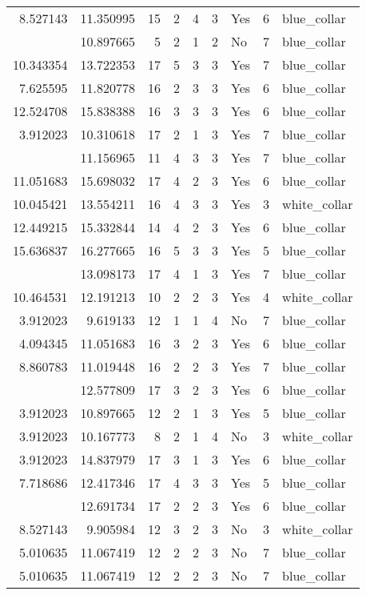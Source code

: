 \documentclass[
]{article}
\begin{document}
\begin{longtable}[t]{rrrrrllrl}
8.527143 & 11.350995 & 15 & 2 & 4 & 3 & Yes & 6 & blue\_collar\\
\addlinespace
3.912023 & 10.897665 & 5 & 2 & 1 & 2 & No & 7 & blue\_collar\\
10.343354 & 13.722353 & 17 & 5 & 3 & 3 & Yes & 7 & blue\_collar\\
7.625595 & 11.820778 & 16 & 2 & 3 & 3 & Yes & 6 & blue\_collar\\
12.524708 & 15.838388 & 16 & 3 & 3 & 3 & Yes & 6 & blue\_collar\\
3.912023 & 10.310618 & 17 & 2 & 1 & 3 & Yes & 7 & blue\_collar\\
\addlinespace
9.110520 & 11.156965 & 11 & 4 & 3 & 3 & Yes & 7 & blue\_collar\\
11.051683 & 15.698032 & 17 & 4 & 2 & 3 & Yes & 6 & blue\_collar\\
10.045421 & 13.554211 & 16 & 4 & 3 & 3 & Yes & 3 & white\_collar\\
12.449215 & 15.332844 & 14 & 4 & 2 & 3 & Yes & 6 & blue\_collar\\
15.636837 & 16.277665 & 16 & 5 & 3 & 3 & Yes & 5 & blue\_collar\\
\addlinespace
3.912023 & 13.098173 & 17 & 4 & 1 & 3 & Yes & 7 & blue\_collar\\
10.464531 & 12.191213 & 10 & 2 & 2 & 3 & Yes & 4 & white\_collar\\
3.912023 & 9.619133 & 12 & 1 & 1 & 4 & No & 7 & blue\_collar\\
4.094345 & 11.051683 & 16 & 3 & 2 & 3 & Yes & 6 & blue\_collar\\
8.860783 & 11.019448 & 16 & 2 & 2 & 3 & Yes & 7 & blue\_collar\\
\addlinespace
12.100990 & 12.577809 & 17 & 3 & 2 & 3 & Yes & 6 & blue\_collar\\
3.912023 & 10.897665 & 12 & 2 & 1 & 3 & Yes & 5 & blue\_collar\\
3.912023 & 10.167773 & 8 & 2 & 1 & 4 & No & 3 & white\_collar\\
3.912023 & 14.837979 & 17 & 3 & 1 & 3 & Yes & 6 & blue\_collar\\
7.718686 & 12.417346 & 17 & 4 & 3 & 3 & Yes & 5 & blue\_collar\\
\addlinespace
10.001068 & 12.691734 & 17 & 2 & 2 & 3 & Yes & 6 & blue\_collar\\
8.527143 & 9.905984 & 12 & 3 & 2 & 3 & No & 3 & white\_collar\\
5.010635 & 11.067419 & 12 & 2 & 2 & 3 & No & 7 & blue\_collar\\
5.010635 & 11.067419 & 12 & 2 & 2 & 3 & No & 7 & blue\_collar\\

\end{longtable}
\end{document}
